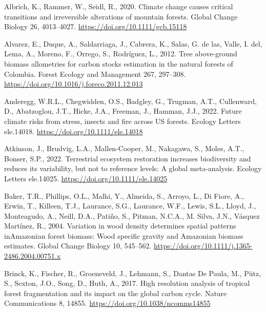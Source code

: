 \documentclass[
  12pt,
]{article}
\newlength{\cslhangindent}
\newlength{\cslentryspacingunit} %
\newenvironment{CSLReferences}[2] %
 {%
  \setlength{\parindent}{0pt}
  \ifodd #1
  \let\oldpar\par
  \def\par{\hangindent=\cslhangindent\oldpar}
  \fi
  \setlength{\parskip}{#2\cslentryspacingunit}
 }%
 {}
\begin{document}
\hypertarget{refs}{}
\begin{CSLReferences}{1}{0}
\leavevmode{}%
Albrich, K., Rammer, W., Seidl, R., 2020. Climate change causes critical transitions and irreversible alterations of mountain forests. Global Change Biology 26, 4013--4027. \url{https://doi.org/10.1111/gcb.15118}

\leavevmode{}%
Alvarez, E., Duque, A., Saldarriaga, J., Cabrera, K., Salas, G. de las, Valle, I. del, Lema, A., Moreno, F., Orrego, S., Rodríguez, L., 2012. Tree above-ground biomass allometries for carbon stocks estimation in the natural forests of {Colombia}. Forest Ecology and Management 267, 297--308. \url{https://doi.org/10.1016/j.foreco.2011.12.013}

\leavevmode{}%
Anderegg, W.R.L., Chegwidden, O.S., Badgley, G., Trugman, A.T., Cullenward, D., Abatzoglou, J.T., Hicke, J.A., Freeman, J., Hamman, J.J., 2022. Future climate risks from stress, insects and fire across {US} forests. Ecology Letters ele.14018. \url{https://doi.org/10.1111/ele.14018}

\leavevmode{}%
Atkinson, J., Brudvig, L.A., Mallen-Cooper, M., Nakagawa, S., Moles, A.T., Bonser, S.P., 2022. Terrestrial ecosystem restoration increases biodiversity and reduces its variability, but not to reference levels: {A} global meta-analysis. Ecology Letters ele.14025. \url{https://doi.org/10.1111/ele.14025}

\leavevmode{}%
Baker, T.R., Phillips, O.L., Malhi, Y., Almeida, S., Arroyo, L., Di Fiore, A., Erwin, T., Killeen, T.J., Laurance, S.G., Laurance, W.F., Lewis, S.L., Lloyd, J., Monteagudo, A., Neill, D.A., Patiño, S., Pitman, N.C.A., M. Silva, J.N., Vásquez Martínez, R., 2004. Variation in wood density determines spatial patterns {inAmazonian} forest biomass: {Wood} specific gravity and {Amazonian} biomass estimates. Global Change Biology 10, 545--562. \url{https://doi.org/10.1111/j.1365-2486.2004.00751.x}

\leavevmode{}%
Brinck, K., Fischer, R., Groeneveld, J., Lehmann, S., Dantas De Paula, M., Pütz, S., Sexton, J.O., Song, D., Huth, A., 2017. High resolution analysis of tropical forest fragmentation and its impact on the global carbon cycle. Nature Communications 8, 14855. \url{https://doi.org/10.1038/ncomms14855}


\end{CSLReferences}
\end{document}
